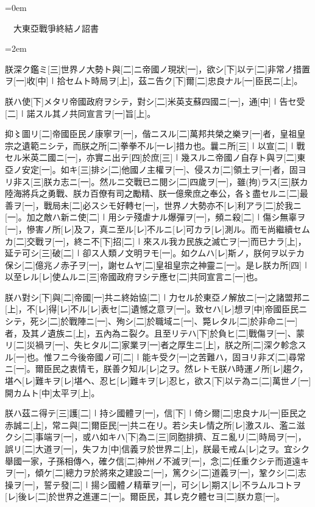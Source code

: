 \documentclass[tate]{jlreq}
\newcommand{\setparindent}[1]{
    \renewcommand{\jlreqparindent}{#1}
    \parindent=#1
}
\begin{document}
\setparindent{0em}

\Kanbun
　大東亞戰爭終結ノ詔書
\EndKanbun

\printkanbun

% 

\vspace{2em}

% 

\setparindent{2em}

\Kanbun
朕深ク鑑ミ[三]世界ノ大勢ト與[二]ニ帝國ノ現狀[一]，欲シ[下]以テ[二]非常ノ措置ヲ[一]收[中]㆐拾セムト時局ヲ[上]，茲ニ告ク[下]爾[二]忠良ナル[一]臣民ニ[上]。

朕ハ使[下]メタリ帝國政府ヲシテ，對シ[二]米英支蘇四國ニ[一]，通[中]㆐告セ受[二]㆐諾スル其ノ共同宣言ヲ[一]旨[上]。

抑〻圖リ[二]帝國臣民ノ康寧ヲ[一]，偕ニスル[二]萬邦共榮之樂ヲ[一]者，皇祖皇宗之遺範ニシテ，而朕之所[二]拳拳不ル[一レ]措カ也。曩ニ所[三]㆐以宣[二]㆐戰セル米英二國ニ[一]，亦實ニ出テ[四]於庶[三]㆐幾スルニ帝國ノ自存ト與ヲ[二]東亞ノ安定[一]。如キ[三]排シ[二]他國ノ主權ヲ[一]、侵スカ[二]領土ヲ[一]者，固ヨリ非ス[三]朕カ志ニ[一]。然ルニ交戰已ニ閱シ[二]四歲ヲ[一]，雖(拘)ラス[三]朕カ陸海將兵之勇戰、朕カ百僚有司之勵精、朕一億衆庶之奉公，各〻盡セルニ[二]最善ヲ[一]，戰局未[二]必スシモ好轉セ[一]，世界ノ大勢亦不[レ]利アラ[二]於我ニ[一]。加之敵ハ新ニ使[二]㆐用シテ殘虐ナル爆彈ヲ[一]，頻ニ殺[二]㆐傷シ無辜ヲ[一]，慘害ノ所[レ]及フ，真ニ至ル[レ]不ルニ[レ]可カラ[レ]測ル。而モ尚繼續セムカ[二]交戰ヲ[一]，終ニ不[下]招[二]㆐來スル我カ民族之滅亡ヲ[一]而已ナラ[上]，延テ可シ[三]破[二]㆐卻ス人類ノ文明ヲモ[一]。如クムハ[レ]斯ノ，朕何ヲ以テカ保シ[二]億兆ノ赤子ヲ[一]，謝セムヤ[二]皇祖皇宗之神靈ニ[一]。是レ朕カ所[四]㆐以至レル[レ]使ムルニ[三]帝國政府ヲシテ應セ[二]共同宣言ニ[一]也。

朕ハ對シ[下]與[二]帝國[一]共ニ終始協[二]㆐力セル於東亞ノ解放ニ[一]之諸盟邦ニ[上]，不[レ]得[レ]不ル[レ]表セ[二]遺憾之意ヲ[一]。致セハ[レ]想ヲ[中]帝國臣民ニシテ，死シ[二]於戰陣ニ[一]、殉シ[二]於職域ニ[一]、斃レタル[二]於非命ニ[一]者，及其ノ遺族ニ[上]，五內為ニ裂ク。且至リテハ[下]於負ヒ[二]戰傷ヲ[一]、蒙リ[二]災禍ヲ[一]、失ヒタル[二]家業ヲ[一]者之厚生ニ[上]，朕之所[二]深ク軫念スル[一]也。惟フニ今後帝國ノ可[二]㆐能キ受ク[一]之苦難ハ，固ヨリ非ズ[二]尋常ニ[一]。爾臣民之衷情モ，朕善ク知ル[レ]之ヲ。然レトモ朕ハ時運ノ所[レ]趨ク，堪ヘ[レ]難キヲ[レ]堪ヘ、忍ヒ[レ]難キヲ[レ]忍ヒ，欲ス[下]以テ為ニ[二]萬世ノ[一]開カムト[中]太平ヲ[上]。

朕ハ茲ニ得テ[三]護[二]㆐持シ國體ヲ[一]，信[下]㆐倚シ爾[二]忠良ナル[一]臣民之赤誠ニ[上]，常ニ與[二]爾臣民[一]共ニ在リ。若シ夫レ情之所[レ]激スル、濫ニ滋クシ[二]事端ヲ[一]，或ハ如キハ[下]為ニ[三]同胞排擠、互ニ亂リ[二]時局ヲ[一]，誤リ[二]大道ヲ[一]，失フカ[中]信義ヲ於世界ニ[上]，朕最モ戒ム[レ]之ヲ。宜シク舉國一家，子孫相傳ヘ，確ク信[二]神州ノ不滅ヲ[一]，念[二]任重クシテ而道遠キヲ[一]，傾ケ[二]總力ヲ於將來之建設ニ[一]，篤クシ[二]道義ヲ[一]，鞏クシ[二]志操ヲ[一]，誓テ發[二]㆐揚シ國體ノ精華ヲ[一]，可シ[レ]期ス[レ]不ラムルコトヲ[レ]後レ[二]於世界之進運ニ[一]。爾臣民，其レ克ク體セヨ[二]朕カ意[一]。
\EndKanbun
\end{document}
